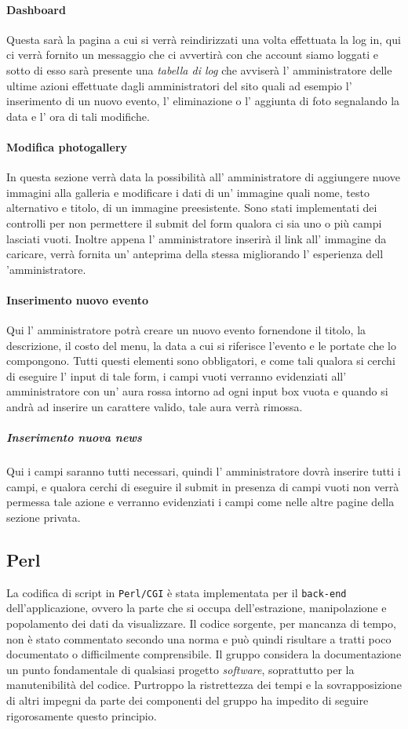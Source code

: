 \paragraph{Dashboard}
Questa sarà la pagina a cui si verrà reindirizzati una volta effettuata la log in, qui ci verrà fornito un messaggio che ci avvertirà con che account siamo loggati e sotto di esso sarà presente una \emph{tabella di log} che avviserà l' amministratore delle ultime azioni effettuate dagli amministratori del sito quali ad esempio l' inserimento di un nuovo evento, l' eliminazione o l' aggiunta di foto segnalando la data e l' ora di tali modifiche.
\paragraph{Modifica photogallery}
In questa sezione verrà data la possibilità all' amministratore di aggiungere nuove immagini alla galleria e modificare i dati di un' immagine quali nome, testo alternativo e titolo, di un immagine preesistente. Sono stati implementati dei controlli per non permettere il submit del form qualora ci sia uno o più campi lasciati vuoti. Inoltre appena l' amministratore inserirà il link all' immagine da caricare, verrà fornita un' anteprima della stessa migliorando l' esperienza dell 'amministratore.
\paragraph{Inserimento nuovo evento}
Qui l' amministratore potrà creare un nuovo evento fornendone il titolo, la descrizione, il costo del menu, la data a cui si riferisce l'evento e le portate che lo compongono. Tutti questi elementi sono obbligatori, e come tali qualora si cerchi di eseguire l' input di tale form, i campi vuoti verranno evidenziati all' amministratore con un' aura rossa intorno ad ogni input box vuota e quando si andrà ad inserire un carattere valido, tale aura verrà rimossa.
\subparagraph{Inserimento nuova news}
Qui i campi saranno tutti necessari, quindi l' amministratore dovrà inserire tutti i campi, e qualora cerchi di eseguire il submit in presenza di campi vuoti non verrà permessa tale azione e verranno evidenziati i campi come nelle altre pagine della sezione privata.

\subsection{Perl}

La codifica di script in \texttt{Perl/CGI} è stata implementata per il \texttt{back-end} dell'applicazione, ovvero la parte che si occupa dell'estrazione, manipolazione e popolamento dei dati da visualizzare. Il codice sorgente, per mancanza di tempo, non è stato commentato secondo una norma e può quindi risultare a tratti poco documentato o difficilmente comprensibile. Il gruppo considera la documentazione un punto fondamentale di qualsiasi progetto \textit{software}, soprattutto per la manutenibilità del codice. Purtroppo la ristrettezza dei tempi e la sovrapposizione di altri impegni da parte dei componenti del gruppo ha impedito di seguire rigorosamente questo principio.

